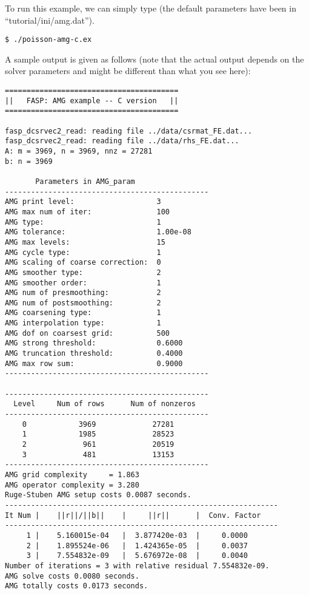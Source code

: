 \documentclass[11pt]{memoir}
\begin{document}
%
To run this example, we can simply type (the default parameters have been in ``tutorial/ini/amg.dat'').
%
\begin{lstlisting}[numbers=none]
$ ./poisson-amg-c.ex
\end{lstlisting}
%
A sample output is given as follows (note that the actual output depends on the solver parameters and might be different than what you see here):
\begin{lstlisting}[numbers=none]
========================================
||   FASP: AMG example -- C version   ||
========================================

fasp_dcsrvec2_read: reading file ../data/csrmat_FE.dat...
fasp_dcsrvec2_read: reading file ../data/rhs_FE.dat...
A: m = 3969, n = 3969, nnz = 27281
b: n = 3969

       Parameters in AMG_param
-----------------------------------------------
AMG print level:                   3
AMG max num of iter:               100
AMG type:                          1
AMG tolerance:                     1.00e-08
AMG max levels:                    15
AMG cycle type:                    1
AMG scaling of coarse correction:  0
AMG smoother type:                 2
AMG smoother order:                1
AMG num of presmoothing:           2
AMG num of postsmoothing:          2
AMG coarsening type:               1
AMG interpolation type:            1
AMG dof on coarsest grid:          500
AMG strong threshold:              0.6000
AMG truncation threshold:          0.4000
AMG max row sum:                   0.9000
-----------------------------------------------

-----------------------------------------------
  Level     Num of rows      Num of nonzeros
-----------------------------------------------
    0            3969             27281
    1            1985             28523
    2             961             20519
    3             481             13153
-----------------------------------------------
AMG grid complexity     = 1.863
AMG operator complexity = 3.280
Ruge-Stuben AMG setup costs 0.0087 seconds.
---------------------------------------------------------------
It Num |    ||r||/||b||    |     ||r||      |  Conv. Factor
---------------------------------------------------------------
     1 |    5.160015e-04   |  3.877420e-03  |     0.0000
     2 |    1.895524e-06   |  1.424365e-05  |     0.0037
     3 |    7.554832e-09   |  5.676972e-08  |     0.0040
Number of iterations = 3 with relative residual 7.554832e-09.
AMG solve costs 0.0080 seconds.
AMG totally costs 0.0173 seconds.
\end{lstlisting}
\end{document}
